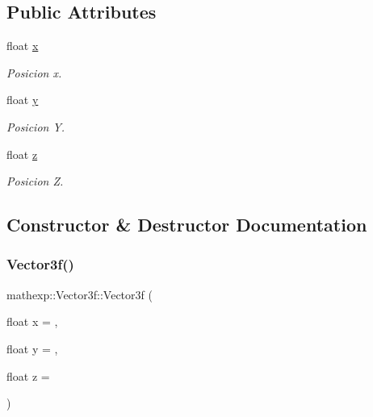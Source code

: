 \subsection*{Public Attributes}
\begin{DoxyCompactItemize}
\item 
float \mbox{\hyperlink{structmathexp_1_1_vector3f_ab36656a53e2a829b9c1950b5d7b5cdc6}{x}}
\begin{DoxyCompactList}\small\item\em Posicion x. \end{DoxyCompactList}\item 
float \mbox{\hyperlink{structmathexp_1_1_vector3f_a7f4643d6f1cb1ab4d8743ae185a66382}{y}}
\begin{DoxyCompactList}\small\item\em Posicion Y. \end{DoxyCompactList}\item 
float \mbox{\hyperlink{structmathexp_1_1_vector3f_a56035190b1b08940cd7cefe3fb41319b}{z}}
\begin{DoxyCompactList}\small\item\em Posicion Z. \end{DoxyCompactList}\end{DoxyCompactItemize}


\subsection{Constructor \& Destructor Documentation}
\mbox{\label{structmathexp_1_1_vector3f_a07228ea1dee8b94ff864e30343fe790a}} 
\subsubsection{\texorpdfstring{Vector3f()}{Vector3f()}\hspace{0.1cm}{\footnotesize\ttfamily [1/2]}}
{\footnotesize\ttfamily mathexp\+::\+Vector3f\+::\+Vector3f (\begin{DoxyParamCaption}\item[{float}]{x = {},  }\item[{float}]{y = {},  }\item[{float}]{z = {} }\end{DoxyParamCaption})}



